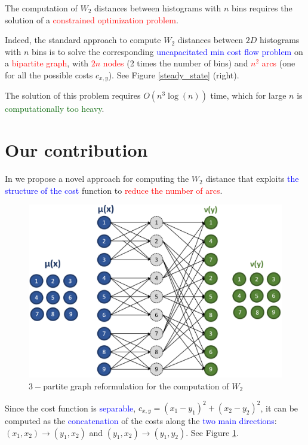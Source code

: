 \documentclass[al, 27pt, plainboxedsections, landscape]{sciposter}
\newcommand{\tb}[1]{\textcolor{blue}{#1}}
\newcommand{\tre}[1]{\textcolor{red}{#1}}
\newcommand{\tgr}[1]{\textcolor{darkgreen}{#1}}
\begin{document}
\begin{multicols}{3}
The computation of  $W_2$ distances between  histograms with $n$ bins
requires the solution of a \tre{constrained optimization problem}.


Indeed, the standard approach to compute $W_2$ distances between $2D$ histograms with $n$ bins is to solve 
the corresponding 
 \tb{uncapacitated min cost flow problem} \cite{GG1} on a  \tre{bipartite graph}, with  \tre{$2n$ nodes} 
 (2 times the number of bins) and  \tre{$n^2$ arcs} (one for all the possible costs $c_{x,y}$).
 See Figure  \ref{steady_state} (right). 
 \newline
 
The solution of this problem requires $O(n^3 \log (n))$ time, which 
for large $n$ is \tgr{computationally too heavy}.
 

\section{Our contribution}

In \cite{GG2}  we  propose a novel approach for computing 
the $W_2$ distance 
 that exploits \tb{the structure of the cost} function to \tre{reduce the number of arcs}. 

\begin{figure}[!t]
	\centering
	\includegraphics[width=0.75\columnwidth]{images/fig6}
	 \caption{$3-$partite graph reformulation for the computation of $W_2$}
     \label{Figure2}
\end{figure}


Since the cost function is \tb{separable}, 
$c_{x,y}=(x_1-y_1)^2 + (x_2-y_2)^2$, it
can be computed as the \tb{concatenation} of  the costs  along the \tb{two main directions}:
$(x_1,x_2) \to (y_1,x_2)$ and $(y_1,x_2) \to (y_1,y_2)$. See Figure \ref{Figure2}. 
\newline


\end{multicols}
\end{document}
